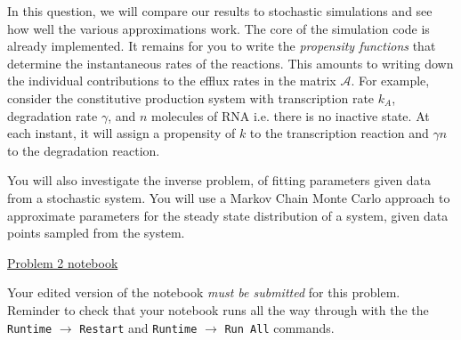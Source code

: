 \documentclass[11pt]{exam}
\begin{document}
\begin{questions}

\newpage
\question[50]
In this question, we will compare our results to stochastic simulations and see how well the various approximations work. The core of the simulation code is already implemented. It remains for you to write the \textit{propensity functions} that determine the instantaneous rates of the reactions. This amounts to writing down the individual contributions to the efflux rates in the matrix $\mathcal{A}$. For example, consider the constitutive production system with transcription rate $k_A$, degradation rate $\gamma$, and $n$ molecules of RNA i.e. there is no inactive state. At each instant, it will assign a propensity of $k$ to the transcription reaction and $\gamma n$ to the degradation reaction. 

You will also investigate the inverse problem, of fitting parameters given data from a stochastic system. You will use a Markov Chain Monte Carlo approach to approximate parameters for the steady state distribution of a system, given data points sampled from the system.

 \href{https://github.com/pachterlab/BI-BE-CS-183-2023/blob/main/HW9/Problem2.ipynb}{Problem 2 notebook}
 

 Your edited version of the notebook \textit{must be submitted } for this problem. Reminder to check that your notebook runs all the way through with the the {\tt Runtime} $\xrightarrow{}$ {\tt Restart} and {\tt Runtime} $\xrightarrow{}$ {\tt Run All} commands.



\end{questions}
\end{document}
